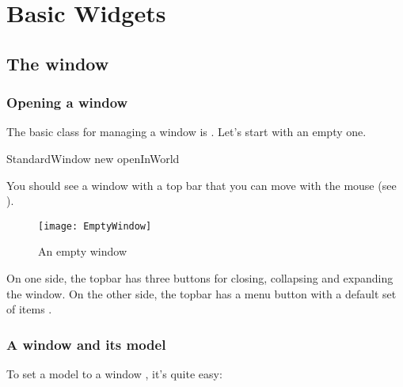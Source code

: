 \documentclass[a4paper,10pt,twoside]{book}
\begin{document}
\fi
\sloppy

\chapter{Basic Widgets}

\section{The window}


\subsection{Opening a window}
The basic class for managing a window is . Let's start with an empty one.

\begin{code}{}
StandardWindow new openInWorld
\end{code}
You should see a window with a top bar  that you can move with the mouse (see ). 

\begin{figure}[ht]
\begin{center}
	\texttt{[image: EmptyWindow]}
	\caption{An empty window}
\end{center}
\end{figure} 

On one side, the topbar has three buttons for closing, collapsing and expanding the window. On the other side, the topbar has a menu button with a default set of items .

\subsection{A window and its model}

To set a model to a window , it's quite easy:
\end{document}

